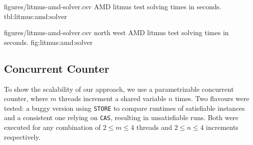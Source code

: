 
\SolverStatsTable
  {figures/litmus-amd-solver.csv}
  {\textnumero}
  {\AMDRowHeader}
  {AMD litmus test solving times in seconds.}
  {tbl:litmus:amd:solver}

\SolverStatsGraph
  {figures/litmus-amd-solver.csv}
  {north west}
  {AMD litmus test solving times in seconds.}
  {fig:litmus:amd:solver}

\newpage

\subsection*{Concurrent Counter}

\newcommand{\tikzmark}[1]{\tikz[overlay,remember picture] \node (#1) {};}
\newcommand*{\AddNote}[3]{%
  \begin{tikzpicture}[overlay, remember picture]
    \draw [decoration={brace,amplitude=0.5em},decorate,thick,red!60!black]
      ($(#1)!([yshift=1.5ex]#1)!($(#1)-(0,1)$)$) --
      ($(#1)!(#2)!($(#1)-(0,1)$)$)
      node [align=center, text width=1.0cm, pos=0.5, anchor=west] {\textsf{#3}};
  \end{tikzpicture}
}%


To show the scalability of our approach, we use a parametrizable concurrent counter, where $m$ threads increment a shared variable $n$ times.
Two flavours were tested: a buggy version using \lstinline[style=asm]{STORE} to compare runtimes of satisfiable instances and a consistent one relying on \lstinline[style=asm]{CAS}, resulting in unsatisfiable runs.
Both were executed for any combination of $2 \leq m \leq 4$ threads and $2 \leq n \leq 4$ increments respectively.


